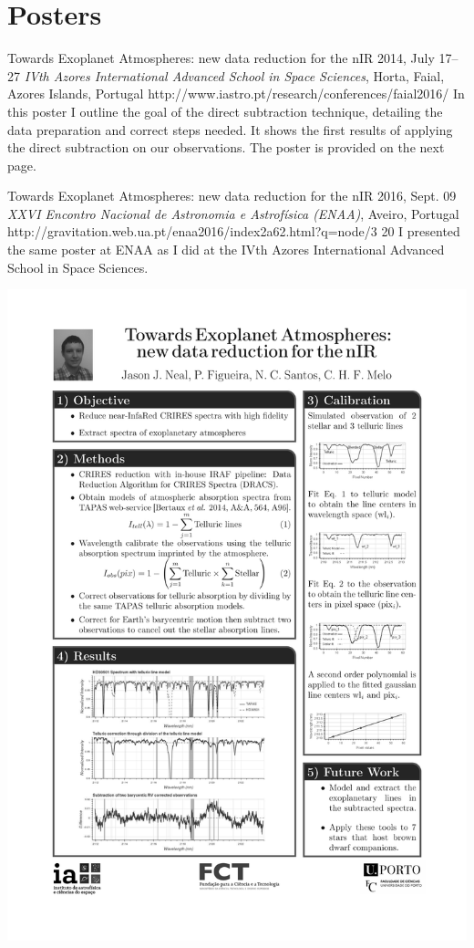 \section{Posters}\label{app_sec:posters}

 {Towards Exoplanet Atmospheres: new data reduction for the nIR}%
{2014, July 17--27}%
{\textit{IVth Azores International Advanced School in Space Sciences}, Horta, Faial, Azores Islands, Portugal}%
{http://www.iastro.pt/research/conferences/faial2016/}%
{}%
{In this poster I outline the goal of the direct subtraction technique, detailing the data preparation and correct steps needed. It shows the first results of applying the direct subtraction on our observations. The poster is provided on the next page.}%


 {Towards Exoplanet Atmospheres: new data reduction for the nIR}%
{2016, Sept. 09}%
{\textit{XXVI Encontro Nacional de Astronomia e Astrofísica (ENAA)}, Aveiro, Portugal}%
{ http://gravitation.web.ua.pt/enaa2016/index2a62.html?q=node/3}%
{20}%
{I presented the same poster at ENAA as I did at the IVth Azores International Advanced School in Space Sciences.}


{\centering \includegraphics[width=1\textwidth, keepaspectratio=true, page = 1, trim = 1.5cm 1cm 1.5cm 1cm, clip = true]{appendices/papers/Azores2016_grey}}